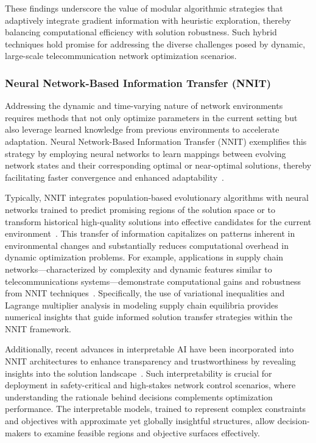 \documentclass[sigconf]{acmart}
\begin{document}
These findings underscore the value of modular algorithmic strategies that adaptively integrate gradient information with heuristic exploration, thereby balancing computational efficiency with solution robustness. Such hybrid techniques hold promise for addressing the diverse challenges posed by dynamic, large-scale telecommunication network optimization scenarios.

\subsubsection{Neural Network-Based Information Transfer (NNIT)}

Addressing the dynamic and time-varying nature of network environments requires methods that not only optimize parameters in the current setting but also leverage learned knowledge from previous environments to accelerate adaptation. Neural Network-Based Information Transfer (NNIT) exemplifies this strategy by employing neural networks to learn mappings between evolving network states and their corresponding optimal or near-optimal solutions, thereby facilitating faster convergence and enhanced adaptability~\cite{ref38,ref39,ref40,ref47}.

Typically, NNIT integrates population-based evolutionary algorithms with neural networks trained to predict promising regions of the solution space or to transform historical high-quality solutions into effective candidates for the current environment~\cite{ref47}. This transfer of information capitalizes on patterns inherent in environmental changes and substantially reduces computational overhead in dynamic optimization problems. For example, applications in supply chain networks—characterized by complexity and dynamic features similar to telecommunications systems—demonstrate computational gains and robustness from NNIT techniques~\cite{ref38}. Specifically, the use of variational inequalities and Lagrange multiplier analysis in modeling supply chain equilibria provides numerical insights that guide informed solution transfer strategies within the NNIT framework.

Additionally, recent advances in interpretable AI have been incorporated into NNIT architectures to enhance transparency and trustworthiness by revealing insights into the solution landscape~\cite{ref39}. Such interpretability is crucial for deployment in safety-critical and high-stakes network control scenarios, where understanding the rationale behind decisions complements optimization performance. The interpretable models, trained to represent complex constraints and objectives with approximate yet globally insightful structures, allow decision-makers to examine feasible regions and objective surfaces effectively.
\end{document}
